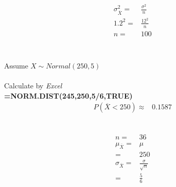 \documentclass{article}
\begin{document}
            \subsubsection{}
                \paragraph{}
                \begin{equation*}
                    \begin{split}
                        \sigma_{\overline{X}}^2=&\frac{\sigma^2}{n}\\
                        1.2^2=&\frac{12^2}{n}\\
                        n=&100\\
                    \end{split}
                \end{equation*}
    \section{}
        \subsection{}
            \paragraph{}
            Assume $X\sim Normal(250,5)$
            \paragraph{}
            Calculate by \textit{Excel}\\
            \textbf{=NORM.DIST(245,250,5/6,TRUE)}
            \begin{equation*}
                \begin{split}
                    P(\overline{X}<250)\approx&0.1587\\
                \end{split}
            \end{equation*}
        \subsection{}
            \paragraph{}
            \begin{equation*}
                \begin{split}
                    n=&36\\
                    \mu_{\overline{X}}=&\mu\\
                        =&250\\
                    \sigma_{\overline{X}}=&\frac{\sigma}{\sqrt{n}}\\
                        =&\frac{5}{6}
                \end{split}
            \end{equation*}
\end{document}
